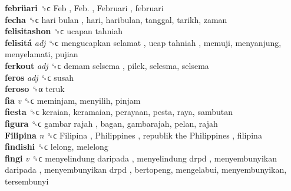 \textbf{febrüari} ␝ϲ   Feb ,  Feb. ,  Februari , februari  \\
\textbf{fecha} ␝ϲ   hari bulan , hari, haribulan, tanggal, tarikh, zaman  \\
\textbf{felisitashon} ␝ϲ   ucapan tahniah   \\
\textbf{felisitá} \emph{adj}  ␝ϲ   mengucapkan selamat ,  ucap tahniah , memuji, menyanjung, menyelamati, pujian  \\
\textbf{ferkout} \emph{adj}  ␝ϲ   demam selsema , pilek, selesma, selsema  \\
\textbf{feros} \emph{adj}  ␝ϲ  susah  \\
\textbf{feroso} ␝α  teruk  \\
\textbf{fia} \emph{v}  ␝ϲ  meminjam, menyilih, pinjam  \\
\textbf{fiesta} ␝ϲ  keraian, keramaian, perayaan, pesta, raya, sambutan  \\
\textbf{figura} ␝ϲ   gambar rajah , bagan, gambarajah, pelan, rajah  \\
\textbf{Filipina} \emph{n}  ␝ϲ   Filipina ,  Philippines ,  republik the Philippines , filipina  \\
\textbf{findishi} ␝ϲ  lelong, melelong  \\
\textbf{fingi} \emph{v}  ␝ϲ   menyelindung daripada ,  menyelindung drpd ,  menyembunyikan daripada ,  menyembunyikan drpd , bertopeng, mengelabui, menyembunyikan, tersembunyi  \\
